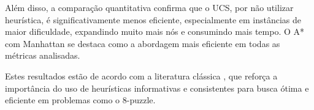 Além disso, a comparação quantitativa confirma que o UCS, por não utilizar heurística, é significativamente menos eficiente, especialmente em instâncias de maior dificuldade, expandindo muito mais nós e consumindo mais tempo. O A* com Manhattan se destaca como a abordagem mais eficiente em todas as métricas analisadas.  
  
Estes resultados estão de acordo com a literatura clássica \cite{russell2010artificial,nilsson1998artificial}, que reforça a importância do uso de heurísticas informativas e consistentes para busca ótima e eficiente em problemas como o 8-puzzle.  
  